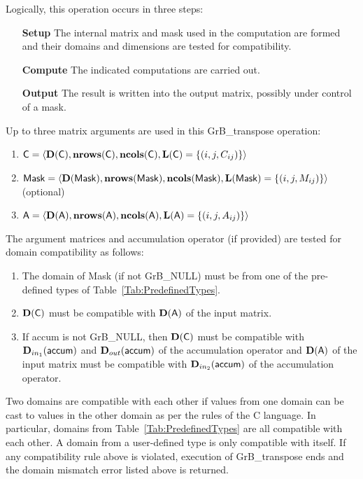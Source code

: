 Logically, this operation occurs in three steps:
\begin{enumerate}[leftmargin=0.75in]
\item[\bf Setup] The internal matrix and mask used in the computation are formed 
and their domains and dimensions are tested for compatibility.
\item[\bf Compute] The indicated computations are carried out.
\item[\bf Output] The result is written into the output matrix, possibly under 
control of a mask.
\end{enumerate}

Up to three matrix arguments are used in this {\sf GrB\_transpose} operation:
\begin{enumerate}
	\item ${\sf C} = \langle \bold{D}({\sf C}),\bold{nrows}({\sf C}),
    \bold{ncols}({\sf C}),\bold{L}({\sf C}) = \{(i,j,C_{ij}) \} \rangle$

	\item ${\sf Mask} = \langle \bold{D}({\sf Mask}),\bold{nrows}({\sf Mask}),
    \bold{ncols}({\sf Mask}),\bold{L}({\sf Mask}) = \{(i,j,M_{ij}) \} \rangle$ (optional)

	\item ${\sf A} = \langle \bold{D}({\sf A}),\bold{nrows}({\sf A}),
    \bold{ncols}({\sf A}),\bold{L}({\sf A}) = \{(i,j,A_{ij}) \} \rangle$
\end{enumerate}

The argument matrices and accumulation 
operator (if provided) are tested for domain compatibility as follows:
\begin{enumerate}
	\item The domain of {\sf Mask} (if not {\sf GrB\_NULL}) must be from one of
    the pre-defined types of Table~\ref{Tab:PredefinedTypes}.

	\item $\bold{D}({\sf C})$ must be
    compatible with $\bold{D}({\sf A})$ of the input matrix.

	\item If {\sf accum} is not {\sf GrB\_NULL}, then $\bold{D}({\sf C})$ must be
    compatible with $\mbox{$\mathbf{D}_{in_{1}}$}({\sf accum})$ and $\mbox{$\mathbf{D}_{out}$}({\sf accum})$ of the accumulation operator and 
    $\bold{D}({\sf A})$ of the input matrix must be compatible with $\mbox{$\mathbf{D}_{in_{2}}$}({\sf accum})$ of the accumulation operator.

\end{enumerate}
Two domains are compatible with each other if values from one domain can be cast 
to values in the other domain as per the rules of the C language.
In particular, domains from Table~\ref{Tab:PredefinedTypes} are all compatible 
with each other. A domain from a user-defined type is only compatible with itself.
If any compatibility rule above is violated, execution of {\sf GrB\_transpose} ends and 
the domain mismatch error listed above is returned.

